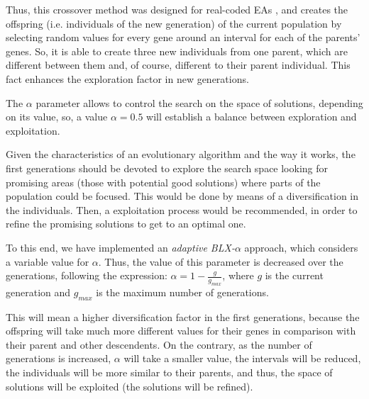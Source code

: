 \documentclass[10pt,journal,compsoc]{IEEEtran}
\begin{document}

Thus, this crossover method was designed for real-coded EAs \cite{blx2008}, and creates the offspring (i.e. individuals of the new generation) of the current population by selecting random values for every gene around an interval for each of the parents' genes. So, it is able to create three new individuals from one parent, which are different between them and, of course, different to their parent individual. This fact enhances the exploration factor in new generations.

The $\alpha$ parameter allows to control the search on the space of solutions, depending on its value, so, a value $\alpha = 0.5$ will establish a balance between exploration and exploitation.

Given the characteristics of an evolutionary algorithm and the way it works, the first generations should be devoted to explore the search space looking for promising areas (those with potential good solutions) where parts of the population could be focused. This would be done by means of a diversification in the individuals. Then, a exploitation process would be recommended, in order to refine the promising solutions to get to an optimal one.

To this end, we have implemented an \textit{adaptive BLX-$\alpha$}
approach, which considers a variable value for $\alpha$. Thus, the
value of this parameter is decreased over the generations, following
the expression: $\alpha =1-\frac{g}{g_{max}}$, where $g$ is the
current generation and $g_{max}$ is the maximum number of generations.

This will mean a higher diversification factor in the first generations, because the offspring will take much more different values for their genes in comparison with their parent and other descendents. %
On the contrary, as the number of generations is increased, $\alpha$ will take a smaller value, the intervals will be reduced, the individuals will be more similar to their parents, and thus, the space of solutions will be exploited (the solutions will be refined).
\end{document}
